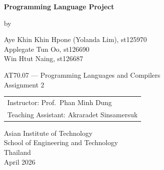 \setcounter{page}{1}
\thispagestyle{empty}

\vspace*{\fill}

\begin{center}
    {\Large \bfseries Programming Language Project}

    \vspace{9em}

    by
    \begin{center}
        Aye Khin Khin Hpone (Yolanda Lim), {\small st125970} \\[0.8em]
        Applegate Tun Oo, {\small st126690} \\[0.8em]
        Win Htut Naing, {\small st126687}
    \end{center}

    \vfill

    \begin{center}
        AT70.07 --- Programming Languages and Compilers \\
        Assignment 2
    \end{center}

    \vspace{3em}

    \begin{tabular}{l}
        Instructor: Prof.\ Phan Minh Dung \\
        Teaching Assistant: Akraradet Sinsamersuk
    \end{tabular}

    \vspace{9em}

    Asian Institute of Technology \\
    School of Engineering and Technology \\
    Thailand \\
    April 2026
\end{center}

\vspace*{\fill}
